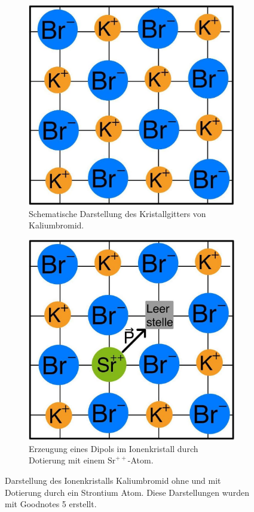 \begin{figure}[H]
    \begin{subfigure}{0.48\textwidth}
    \centering
    \includegraphics[width=0.85\linewidth]{figs/Kaliumbromid.jpg}
    \caption{Schematische Darstellung des Kristallgitters von Kaliumbromid.}
    \label{fig:tfig1}
    \end{subfigure}
    \begin{subfigure}{0.48\textwidth}
    \centering
    \includegraphics[width=0.85\linewidth]{figs/DipolKBr.jpg}
    \caption{Erzeugung eines Dipols im Ionenkristall durch Dotierung mit einem $\text{Sr}^{++}$-Atom.}
    \label{fig:tfig2}
    \end{subfigure}
    \caption{Darstellung des Ionenkristalls Kaliumbromid ohne und mit Dotierung durch ein Strontium Atom. Diese Darstellungen wurden mit Goodnotes 5 \cite{GN5} erstellt.}
\end{figure}

